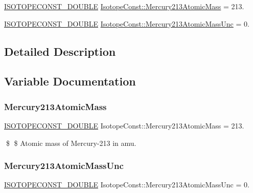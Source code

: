 \begin{DoxyCompactItemize}
\item 
\mbox{\hyperlink{group___isotope_const-_macros_ga8f45a7272ce02c0b4c65c44636ed719a}{I\+S\+O\+T\+O\+P\+E\+C\+O\+N\+S\+T\+\_\+\+D\+O\+U\+B\+LE}} \mbox{\hyperlink{group___isotope_const-_mercury-_hg213_gaddaf014d7812bc0bc95220fe394c2db8}{Isotope\+Const\+::\+Mercury213\+Atomic\+Mass}} = 213.
\item 
\mbox{\hyperlink{group___isotope_const-_macros_ga8f45a7272ce02c0b4c65c44636ed719a}{I\+S\+O\+T\+O\+P\+E\+C\+O\+N\+S\+T\+\_\+\+D\+O\+U\+B\+LE}} \mbox{\hyperlink{group___isotope_const-_mercury-_hg213_ga8dc4416f60bed44dd93af405f68b3ea1}{Isotope\+Const\+::\+Mercury213\+Atomic\+Mass\+Unc}} = 0.
\end{DoxyCompactItemize}


\subsection{Detailed Description}


\subsection{Variable Documentation}
\mbox{\label{group___isotope_const-_mercury-_hg213_gaddaf014d7812bc0bc95220fe394c2db8}} 
\subsubsection{\texorpdfstring{Mercury213\+Atomic\+Mass}{Mercury213AtomicMass}}
{\footnotesize\ttfamily \mbox{\hyperlink{group___isotope_const-_macros_ga8f45a7272ce02c0b4c65c44636ed719a}{I\+S\+O\+T\+O\+P\+E\+C\+O\+N\+S\+T\+\_\+\+D\+O\+U\+B\+LE}} Isotope\+Const\+::\+Mercury213\+Atomic\+Mass = 213.}

\$ \$ Atomic mass of Mercury-\/213 in amu. \mbox{\label{group___isotope_const-_mercury-_hg213_ga8dc4416f60bed44dd93af405f68b3ea1}} 
\subsubsection{\texorpdfstring{Mercury213\+Atomic\+Mass\+Unc}{Mercury213AtomicMassUnc}}
{\footnotesize\ttfamily \mbox{\hyperlink{group___isotope_const-_macros_ga8f45a7272ce02c0b4c65c44636ed719a}{I\+S\+O\+T\+O\+P\+E\+C\+O\+N\+S\+T\+\_\+\+D\+O\+U\+B\+LE}} Isotope\+Const\+::\+Mercury213\+Atomic\+Mass\+Unc = 0.}

